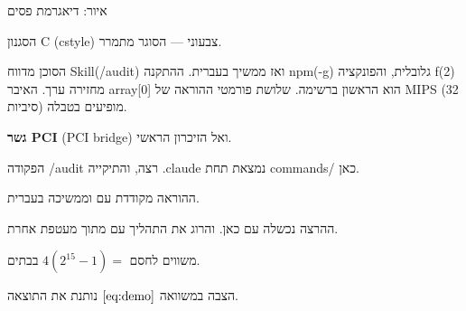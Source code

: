 {\centering\small\textcolor{cGray}{איור: \label{fig:x}דיאגרמת פסים}\par}

הסגנון C (cstyle) צבעוני — הסוגר מתמרר.

הסוכן מדווח Skill(/audit) ואז ממשיך בעברית.
ההתקנה npm(-g) גלובלית, והפונקציה f(2) מחזירה ערך.
האיבר array[0] הוא הראשון ברשימה.
שלושת פורמטי ההוראה של MIPS (32 סיביות) מופיעים בטבלה.

\textbf{גשר PCI} (PCI bridge) ואל הזיכרון הראשי.

הפקודה /audit רצה, והתיקייה .claude נמצאת תחת commands/ כאן.

ההוראה מקודדת עם  וממשיכה בעברית.

ההרצה נכשלה עם  כאן.
והרוג את התהליך עם  מתוך מעטפת אחרת.

משווים לחסם $4(2^{15}{-}1)=$ בבתים.

הצבה במשוואה $\eqref{eq:demo}$ נותנת את התוצאה.

